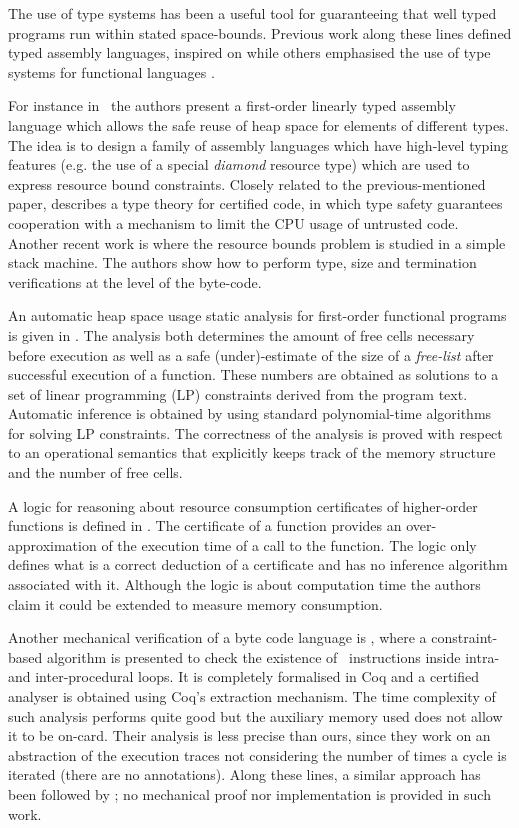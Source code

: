 The use of type systems has been a useful tool for guaranteeing that well typed programs run within stated space-bounds.
 Previous work along these lines defined typed assembly languages, inspired on \cite{MWCG99tal} while others emphasised the use of type systems for functional languages \cite{AH02ats,Hofmann00tsb,HP99rdd}. 


For instance in~\cite{AC03hba} the authors present a first-order linearly typed assembly language which allows the safe reuse of heap space for elements of different types. The idea is to design a family of assembly languages which have high-level typing features (e.g. the use of a special {\em diamond} resource type) which are used to express resource bound constraints. Closely related to the previous-mentioned paper, \cite{VC04fta} describes a type theory for certified code, in which type safety guarantees cooperation with a mechanism to limit the CPU usage of untrusted code. Another recent work is \cite{ACDJ04fsb} where the resource bounds problem is studied in a simple stack machine. The authors show how to perform type, size and termination verifications at the level of the byte-code.

An automatic heap space usage static analysis for first-order functional programs is given in \cite{HJ03sph}. The analysis both determines the amount of free cells necessary before execution as well as a safe (under)-estimate of the size of a \emph{free-list} after successful execution of a
function.  These numbers are obtained as solutions to a set of linear
programming (LP) constraints derived from the program text. Automatic
inference is obtained by using standard polynomial-time algorithms for
solving LP constraints. The correctness of the analysis is proved
with respect to an operational semantics that explicitly keeps track of
the memory structure and the number of free cells.

A logic for reasoning
about resource consumption certificates of higher-order functions is defined in \cite{CW00rbc}. The
certificate of a function provides an over-approximation of the
execution time of a call to the function. The logic only defines what 
is a correct deduction of a certificate and has no inference
algorithm associated with it. Although the logic is about computation time the authors claim it could be extended to measure memory consumption. 

Another mechanical verification of a byte code language is \cite{CJPS05cmu}, where a constraint-based algorithm is presented to check the existence of \new\ instructions inside intra- and inter-procedural loops. It is completely formalised in Coq and a certified analyser is obtained using Coq's extraction mechanism. The time complexity of such analysis performs quite good but the auxiliary memory used does not allow it to be on-card. Their analysis is less precise than ours, since they work on an abstraction of the execution traces not considering the number of times a cycle is iterated (there are no annotations). Along these lines, a similar approach has been followed by \cite{schneider04cba}; no mechanical proof nor implementation is provided in such work.

